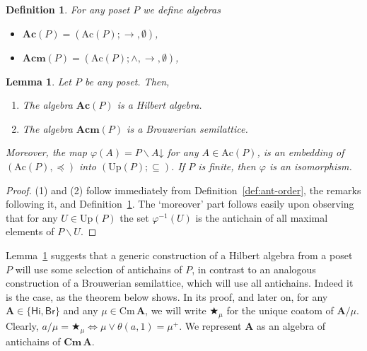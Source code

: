 \documentclass{amsart}
\newtheorem{lemma}[theorem]{Lemma}
\newtheorem{defn}[theorem]{Definition}
\newcommand{\alg}[1]{\mathbf{#1}}
\newcommand{\var}[1]{\mathsf{#1}}
\newcommand{\Cm}[1]{\mathbf{Cm}\, #1}
\newcommand{\cm}[1]{\mathrm{Cm}\, #1}
\def\ra{\rightarrow}
\def\dw#1{{#1}\mathord{\downarrow}}
\def\op{\bigstar}
\begin{document}
\begin{defn}\label{def:antichain-alg}
For any poset $P$ we define algebras
\begin{itemize}  
\item $\alg{Ac}(P) = (\mathrm{Ac}(P); \ra,\emptyset)$,
\item $\alg{Acm}(P) = (\mathrm{Ac}(P); \wedge,\ra,\emptyset)$,
\end{itemize}
\end{defn}

\begin{lemma}\label{lem:antichain-alg}
Let $P$ be any poset. Then,
\begin{enumerate}
\item The algebra $\alg{Ac}(P)$ is a Hilbert algebra.
\item The algebra $\alg{Acm}(P)$ is a Brouwerian semilattice. 
\end{enumerate}
Moreover, the map $\varphi(A) = P\smallsetminus \dw{A}$ for any
$A\in\mathrm{Ac}(P)$, is an embedding
of ${(\mathrm{Ac}(P), \preccurlyeq)}$ into $(\mathrm{Up}(P); \subseteq)$.
If $P$ is finite, then $\varphi$ is an isomorphism.
\end{lemma}

\begin{proof}
(1) and (2) follow immediately from Definition~\ref{def:ant-order}, the
remarks following it, and Definition~\ref{def:antichain-alg}. The `moreover' part
follows easily upon observing that for any $U\in\mathrm{Up}(P)$ the set
$\varphi^{-1}(U)$ is the antichain of all maximal elements of $P\smallsetminus U$. 
\end{proof}  


Lemma~\ref{lem:antichain-alg} suggests that a generic construction of a Hilbert
algebra from a poset $P$ will use some selection of antichains of $P$, in
contrast to an analogous construction of a Brouwerian semilattice, which will
use all antichains. Indeed it is the case, as the theorem below shows.
In its proof, and later on, for any $\alg{A}\in\{\var{Hi},\var{Br}\}$
and any $\mu\in\cm{\alg{A}}$, we will write $\op_\mu$ for the 
unique coatom of 
$\alg{A}/\mu$. Clearly, $a/\mu = \op_\mu\iff \mu\vee\theta(a,1) = \mu^+$.
We represent $\alg{A}$ as an algebra of antichains of $\Cm{\alg{A}}$.
\end{document}
